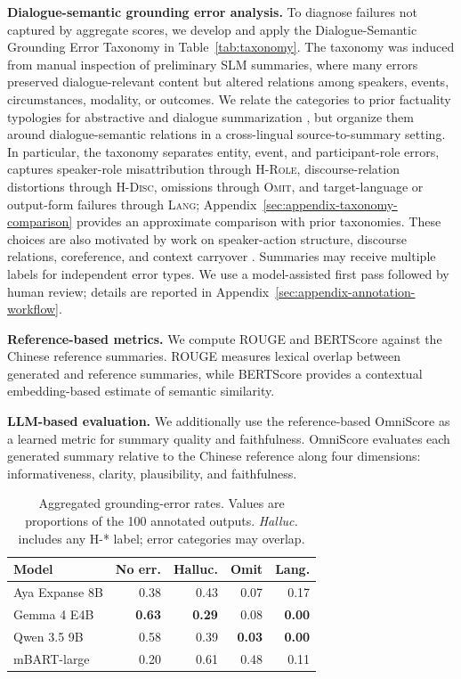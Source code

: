 \documentclass[11pt]{article}
\begin{document}
\noindent\textbf{Dialogue-semantic grounding error analysis.} To diagnose failures not captured by aggregate scores, we develop and apply the Dialogue-Semantic Grounding Error Taxonomy in Table~\ref{tab:taxonomy}. The taxonomy was induced from manual inspection of preliminary SLM summaries, where many errors preserved dialogue-relevant content but altered relations among speakers, events, circumstances, modality, or outcomes. We relate the categories to prior factuality typologies for abstractive and dialogue summarization \citep{pagnoni-etal-2021-understanding,tang-etal-2022-confit,wang-etal-2022-analyzing}, but organize them around dialogue-semantic relations in a cross-lingual source-to-summary setting. In particular, the taxonomy separates entity, event, and participant-role errors, captures speaker-role misattribution through \textsc{H-Role}, discourse-relation distortions through \textsc{H-Disc}, omissions through \textsc{Omit}, and target-language or output-form failures through \textsc{Lang}; Appendix~\ref{sec:appendix-taxonomy-comparison} provides an approximate comparison with prior taxonomies. These choices are also motivated by work on speaker-action structure, discourse relations, coreference, and context carryover \citep{chen-yang-2021-structure,aghajanyan-etal-2020-conversational}. Summaries may receive multiple labels for independent error types. We use a model-assisted first pass followed by human review; details are reported in Appendix~\ref{sec:appendix-annotation-workflow}.


\noindent\textbf{Reference-based metrics.} We compute ROUGE \citep{lin-2004-rouge} and BERTScore \citep{zhang2020bertscoreevaluatingtextgeneration} against the Chinese reference summaries. ROUGE measures lexical overlap between generated and reference summaries, while BERTScore provides a contextual embedding-based estimate of semantic similarity.

\noindent\textbf{LLM-based evaluation.} We additionally use the reference-based OmniScore \citep{alam-etal-2026-omniscore} as a learned metric for summary quality and faithfulness. OmniScore evaluates each generated summary relative to the Chinese reference along four dimensions: informativeness, clarity, plausibility, and faithfulness.

\begin{table}[H]
\centering
\small
\begin{tabular}{lrrrr}
\hline
Model & No err. & Halluc. & Omit & Lang. \\
\hline
Aya Expanse 8B & 0.38 & 0.43 & 0.07 & 0.17 \\
Gemma 4 E4B    & \textbf{0.63} & \textbf{0.29} & 0.08 & \textbf{0.00} \\
Qwen 3.5 9B    & 0.58 & 0.39 & \textbf{0.03} & \textbf{0.00} \\
mBART-large    & 0.20 & 0.61 & 0.48 & 0.11 \\
\hline
\end{tabular}
\caption{Aggregated grounding-error rates. Values are proportions of the 100 annotated outputs. \textit{Halluc.} includes any \textsc{H-*} label; error categories may overlap.}
\label{tab:grounding-results}
\end{table}
\end{document}
